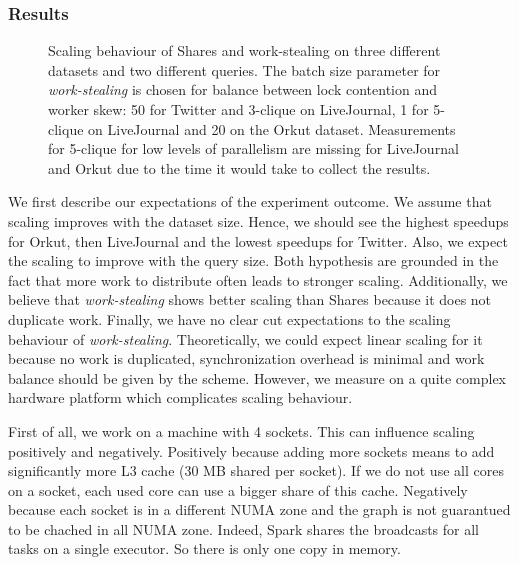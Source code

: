 
\subsubsection{Results}

\begin{figure}
    \centering
    \newline
    \caption{Scaling behaviour of Shares and work-stealing on three different datasets
      and two different queries.
      The batch size parameter for \textit{work-stealing} is chosen for balance between lock contention and worker skew:
      50 for Twitter and 3-clique on LiveJournal, 1 for 5-clique on LiveJournal and 20 on the Orkut dataset.
      Measurements for 5-clique for low levels of parallelism are missing for LiveJournal and Orkut due to the time it would take
      to collect the results.
    }
    \label{fig:graphWCOJ-scaling}
\end{figure}

We first describe our expectations of the experiment outcome.
We assume that scaling improves with the dataset size.
Hence, we should see the highest speedups for Orkut, then LiveJournal and the lowest speedups for Twitter.
Also, we expect the scaling to improve with the query size.
Both hypothesis are grounded in the fact that more work to distribute often leads to stronger scaling.
Additionally, we believe that \textit{work-stealing} shows better scaling than Shares because it does not duplicate work.
Finally, we have no clear cut expectations to the scaling behaviour of \textit{work-stealing}.
Theoretically, we could expect linear scaling for it because no work is duplicated, synchronization overhead is minimal and
work balance should be given by the scheme.
However, we measure on a quite complex hardware platform which complicates scaling behaviour.

First of all, we work on a machine with 4 sockets.
This can influence scaling positively and negatively.
Positively because adding more sockets means to add significantly more L3 cache (30 MB shared per socket).
If we do not use all cores on a socket, each used core can use a bigger share of this cache.
Negatively because each socket is in a different NUMA zone and the graph is not guarantued to be chached in all
NUMA zone.
Indeed, Spark shares the broadcasts for all tasks on a single executor.
So there is only one copy in memory. %

